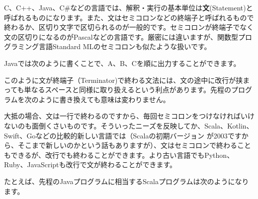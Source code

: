 C、C++、Java、C\#などの言語では、解釈・実行の基本単位は\textbf{文}(Statement)と呼ばれるものになります。また、文はセミコロンなどの終端子と呼ばれるもので終わるか、区切り文字で区切られるのが一般的です。セミコロンが終端子でなく文の区切りになるのがPascalなどの言語です。厳密には違いますが、関数型プログラミング言語Standard
MLのセミコロンも似たような扱いです。

Javaでは次のように書くことで、A、B、Cを順に出力することができます。

\begin{Shaded}
\begin{Highlighting}[]
\NormalTok{(}\NormalTok{);}
\NormalTok{(}\NormalTok{);}
\NormalTok{(}\NormalTok{);}
\end{Highlighting}
\end{Shaded}

このように文が終端子（Terminator)で終わる文法には、文の途中に改行が挟まっても単なるスペースと同様に取り扱えるという利点があります。先程のプログラムを次のように書き換えても意味は変わりません。

\begin{Shaded}
\begin{Highlighting}[]
\NormalTok{(}
  \NormalTok{);}
\NormalTok{(}
  \NormalTok{);}
\NormalTok{(}
  \NormalTok{);}
\end{Highlighting}
\end{Shaded}

大抵の場合、文は一行で終わるのですから、毎回セミコロンをつけなければいけないのも面倒くさいものです。そういったニーズを反映してか、Scala、Kotlin、Swift、Goなどの比較的新しい言語では（Scalaの初期バージョン
が2003ですから、そこまで新しいのかという話もありますが）、文はセミコロンで終わることもできるが、改行でも終わることができます。より古い言語でもPython、Ruby、JavaScriptも改行で文が終わることができます。

たとえば、先程のJavaプログラムに相当するScalaプログラムは次のようになります。

